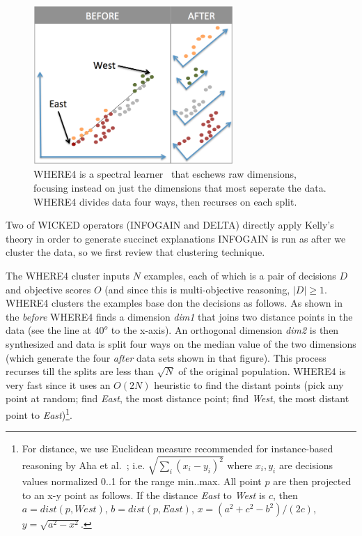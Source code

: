 \documentclass[runningheads]{llncs}
\begin{document}
\begin{figure}
\includegraphics[width=3in]{4WAY.png}
\caption{WHERE4 is a spectral learner~\cite{kamvar03}  that eschews
raw dimensions, focusing instead on just the dimensions that
most seperate the data.
WHERE4 divides data four ways, then recurses on each split.
}\label{fig:4WAY}
\end{figure}
Two of WICKED operators (INFOGAIN and DELTA)
directly apply Kelly's theory in order to generate succinct explanations
INFOGAIN is run as after we cluster the data,
so we first review that clustering technique.

The WHERE4 cluster inputs $N$ examples, each of which is a pair of
decisions $D$ and objective scores $O$ (and since this is multi-objective
reasoning, $|D| \ge 1$. WHERE4 clusters the examples base don the decisions
as follows. 
As shown in the {\em
before}  WHERE4 finds a dimension {\em dim1} that
joins  two distance points in the data (see the line at $40^o$ to the x-axis).
An orthogonal dimension {\em dim2} is then synthesized and data is split
four ways on the median value of the two dimensions (which generate the
four {\em after} data sets shown in that figure). This process recurses
till the splits are less than $\sqrt{N}$ of the original population.
WHERE4 is very fast since it uses an $O(2N)$ heuristic to find the
distant points (pick any point at random; find {\em East},
the most distance point; find {\em West}, the most distant point to {\em East})\footnote{
 For distance, we use Euclidean measure recommended for
instance-based reasoning by Aha et al.~\cite{aha91};
i.e. $\sqrt{\sum_i(x_i-y_i)^2}$ where $x_i,y_i$ 
are decisions values normalized 0..1 for the range min..max.
All point $p$ are then projected to an x-y point as follows. If the
distance {\em East} to {\em West} is $c$, then
\mbox{$a=\mathit{dist}(p,\mathit{West})$},
\mbox{$b=\mathit{dist}(p,\mathit{East})$},
\mbox{$x=(a^2 + c^2 - b^2)/(2c)$},
\mbox{$y=\sqrt{a^2 - x^2}$}.}.
\end{document}
